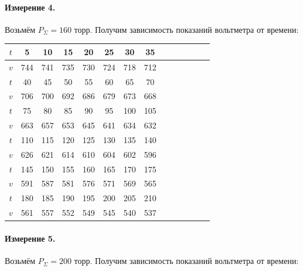 \documentclass[a4paper,12pt]{article} %
\begin{document}
\paragraph{Измерение 4.}
Возьмём $P_\Sigma = 160$ торр. Получим зависимость показаний вольтметра от времени:

\begin{center}
\begin{tabular}{|c||c|c|c|c|c|c|c|c|c|c|c|c|c|}
\hline
$t$ & 5 & 10 & 15 & 20 & 25 & 30 & 35 \\ 
\hline
$v$ & 744 & 741 & 735 & 730 & 724 & 718 & 712 \\ 
\hline
\hline
$t$ & 40 & 45 & 50 & 55 & 60 & 65 & 70 \\ 
\hline
$v$ & 706 & 700 & 692 & 686 & 679 & 673 & 668 \\ 
\hline
\hline
$t$ & 75 & 80 & 85 & 90 & 95 & 100 & 105 \\ 
\hline
$v$ & 663 & 657 & 653 & 645 & 641 & 634 & 632 \\ 
\hline
\hline
$t$ & 110 & 115 & 120 & 125 & 130 & 135 & 140 \\ 
\hline
$v$ & 626 & 621 & 614 & 610 & 604 & 602 & 596 \\ 
\hline
\hline
$t$ & 145 & 150 & 155 & 160 & 165 & 170 & 175 \\ 
\hline
$v$ & 591 & 587 & 581 & 576 & 571 & 569 & 565 \\ 
\hline
\hline
$t$ & 180 & 185 & 190 & 195 & 200 & 205 & 210 \\ 
\hline
$v$ & 561 & 557 & 552 & 549 & 545 & 540 & 537 \\ 
\hline
\end{tabular}
\end{center}


\paragraph{Измерение 5.}
Возьмём $P_\Sigma = 200$ торр. Получим зависимость показаний вольтметра от времени:
\end{document}
